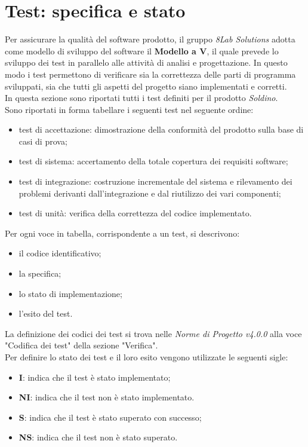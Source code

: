 \section{Test: specifica e stato}
Per assicurare la qualità del software prodotto, il gruppo \textit{8Lab Solutions} adotta come modello di sviluppo del software il \textbf{Modello a V\glo}, il quale prevede lo sviluppo dei test in parallelo alle attività di analisi e progettazione.
In questo modo i test permettono di verificare sia la correttezza delle parti di programma sviluppati, sia che tutti gli aspetti del progetto siano implementati e corretti.
\\
In questa sezione sono riportati tutti i test definiti per il prodotto \textit{Soldino}.\\
Sono riportati in forma tabellare i seguenti test nel seguente ordine:
\begin{itemize}
	\item test di accettazione: dimostrazione della conformità del prodotto sulla base di casi di prova;
	\item test di sistema: accertamento della totale copertura dei requisiti software;
	\item test di integrazione: costruzione incrementale del sistema e rilevamento dei problemi derivanti dall'integrazione e dal riutilizzo dei vari componenti;
	\item test di unità: verifica della correttezza del codice implementato.
\end{itemize}
Per ogni voce in tabella, corrispondente a un test, si descrivono:
\begin{itemize}
	\item il codice identificativo;
	\item la specifica;
	\item lo stato di implementazione;
	\item l'esito del test.
\end{itemize}
La definizione dei codici dei test si trova nelle \textit{Norme di Progetto v4.0.0} alla voce "Codifica dei test" della sezione "Verifica".\\
Per definire lo stato dei test e il loro esito vengono utilizzate le seguenti sigle:
\begin{itemize}
	\item \textbf{I}: indica che il test è stato implementato;
	\item \textbf{NI}: indica che il test non è stato implementato.
	\item \textbf{S}: indica che il test è stato superato con successo;
	\item \textbf{NS}: indica che il test non è stato superato.
\end{itemize}

